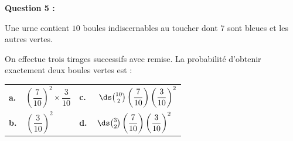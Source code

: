 \medskip

\textbf{Question 5 :}

\medskip

Une urne contient $10$ boules indiscernables au toucher dont $7$ sont bleues et les autres vertes.

On effectue trois tirages successifs avec remise. La probabilité d'obtenir exactement deux boules vertes est :

\smallskip

\begin{tabularx}{\linewidth}{X X}
\textbf{a.~~}$\left(\dfrac{7}{10}\right)^2 \times \dfrac{3}{10}$&\textbf{c.~~} $\ds\binom{10}{2}\left(\dfrac{7}{10}\right)\left(\dfrac{3}{10}\right)^2$\\
\textbf{b.~~}$\left(\dfrac{3}{10}\right)^2$&\textbf{d.~~}$\ds\binom{3}{2}\left(\dfrac{7}{10}\right)\left(\dfrac{3}{10}\right)^2$
\end{tabularx}

\bigskip

